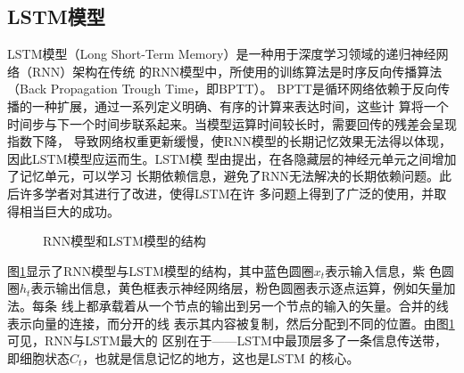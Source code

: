 \documentclass[lang=cn,11.9pt,a4paper,cite=authoryear]{elegantpaper}
\begin{document}
\subsection{LSTM模型}
LSTM模型（Long Short-Term Memory）是一种用于深度学习领域的递归神经网络（RNN）架构在传统
的RNN模型中，所使用的训练算法是时序反向传播算法（Back Propagation Trough 
Time，即BPTT）。
BPTT是循环网络依赖于反向传播的一种扩展，通过一系列定义明确、有序的计算来表达时间，这些计
算将一个时间步与下一个时间步联系起来。当模型运算时间较长时，需要回传的残差会呈现指数下降，
导致网络权重更新缓慢，使RNN模型的长期记忆效果无法得以体现，因此LSTM模型应运而生。LSTM模
型由\cite{hochreiter1997lstm}提出，在各隐藏层的神经元单元之间增加了记忆单元，可以学习
长期依赖信息，避免了RNN无法解决的长期依赖问题。此后许多学者对其进行了改进，使得LSTM在许
多问题上得到了广泛的使用，并取得相当巨大的成功\citep{gers2000learning, 
graves2005bidirectional, graves2005framewise, schmidhuber2007training, 
bayer2009evolving, schaul2010pybrain, graves2013hybrid, bayer2014Learning}。

\begin{figure}[htp]
	\centering
    \caption{RNN模型和LSTM模型的结构}
	\label{fig:structure}
\end{figure}

图\ref{fig:structure}显示了RNN模型与LSTM模型的结构，其中蓝色圆圈$x_t$表示输入信息，紫
色圆圈$h_t$表示输出信息，黄色框表示神经网络层，粉色圆圈表示逐点运算，例如矢量加法。每条
线上都承载着从一个节点的输出到另一个节点的输入的矢量。合并的线表示向量的连接，而分开的线
表示其内容被复制，然后分配到不同的位置。由图\ref{fig:structure}可见，RNN与LSTM最大的
区别在于——LSTM中最顶层多了一条信息传送带，即细胞状态$C_t$，也就是信息记忆的地方，这也是LSTM
的核心。
\end{document}
